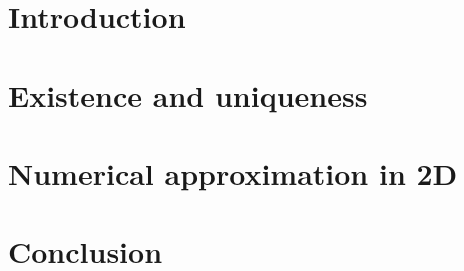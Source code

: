 \documentclass[12pt,a4paper]{report}
\numberwithin{equation}{section}
\numberwithin{figure}{section}
\numberwithin{lemma}{section}
\theoremstyle{definition}
\begin{document}
\tableofcontents
\chapter{Introduction}

\chapter{Existence and uniqueness}

\chapter{Numerical approximation in 2D}

\chapter{Conclusion}

\printbibliography
\end{document}
